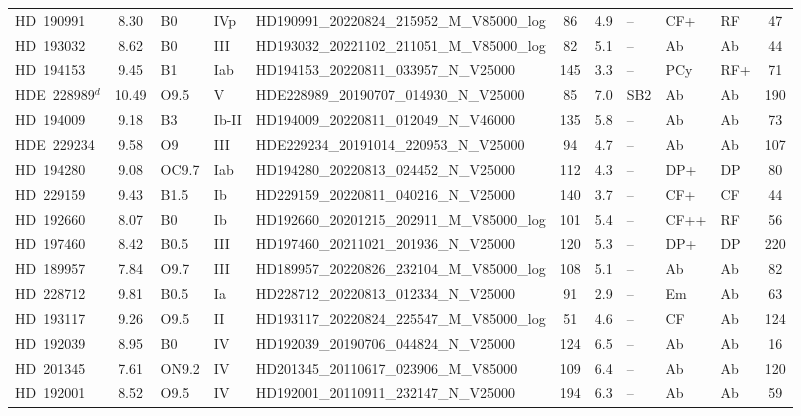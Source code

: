 {\begin{landscape}
\begin{longtable}{lclllcclllc}
\noalign{\smallskip}
HD~190991 & 8.30 & B0 & IVp & HD190991\_20220824\_215952\_M\_V85000\_log & 86 & 4.9 & -- & CF+ & RF & 47 \\
\noalign{\smallskip}
HD~193032 & 8.62 & B0 & III & HD193032\_20221102\_211051\_M\_V85000\_log & 82 & 5.1 & -- & Ab & Ab & 44 \\
\noalign{\smallskip}
HD~194153 & 9.45 & B1 & Iab & HD194153\_20220811\_033957\_N\_V25000 & 145 & 3.3 & -- & PCy & RF+ & 71 \\
\noalign{\smallskip}
HDE~228989$^{d}$ & 10.49 & O9.5 & V & HDE228989\_20190707\_014930\_N\_V25000 & 85 & 7.0 & SB2 & Ab & Ab & 190 \\
\noalign{\smallskip}
HD~194009 & 9.18 & B3 & Ib-II & HD194009\_20220811\_012049\_N\_V46000 & 135 & 5.8 & -- & Ab & Ab & 73 \\
\noalign{\smallskip}
HDE~229234 & 9.58 & O9 & III & HDE229234\_20191014\_220953\_N\_V25000 & 94 & 4.7 & -- & Ab & Ab & 107 \\
\noalign{\smallskip}
HD~194280 & 9.08 & OC9.7 & Iab & HD194280\_20220813\_024452\_N\_V25000 & 112 & 4.3 & -- & DP+ & DP & 80 \\
\noalign{\smallskip}
HD~229159 & 9.43 & B1.5 & Ib & HD229159\_20220811\_040216\_N\_V25000 & 140 & 3.7 & -- & CF+ & CF & 44 \\
\noalign{\smallskip}
HD~192660 & 8.07 & B0 & Ib & HD192660\_20201215\_202911\_M\_V85000\_log & 101 & 5.4 & -- & CF++ & RF & 56 \\
\noalign{\smallskip}
HD~197460 & 8.42 & B0.5 & III & HD197460\_20211021\_201936\_N\_V25000 & 120 & 5.3 & -- & DP+ & DP & 220 \\
\noalign{\smallskip}
HD~189957 & 7.84 & O9.7 & III & HD189957\_20220826\_232104\_M\_V85000\_log & 108 & 5.1 & -- & Ab & Ab & 82 \\
\noalign{\smallskip}
HD~228712 & 9.81 & B0.5 & Ia & HD228712\_20220813\_012334\_N\_V25000 & 91 & 2.9 & -- & Em & Ab & 63 \\
\noalign{\smallskip}
HD~193117 & 9.26 & O9.5 & II & HD193117\_20220824\_225547\_M\_V85000\_log & 51 & 4.6 & -- & CF & Ab & 124 \\
\noalign{\smallskip}
HD~192039 & 8.95 & B0 & IV & HD192039\_20190706\_044824\_N\_V25000 & 124 & 6.5 & -- & Ab & Ab & 16 \\
\noalign{\smallskip}
HD~201345 & 7.61 & ON9.2 & IV & HD201345\_20110617\_023906\_M\_V85000 & 109 & 6.4 & -- & Ab & Ab & 120 \\
\noalign{\smallskip}
HD~192001 & 8.52 & O9.5 & IV & HD192001\_20110911\_232147\_N\_V25000 & 194 & 6.3 & -- & Ab & Ab & 59 \\

\end{longtable}
\end{landscape}}
